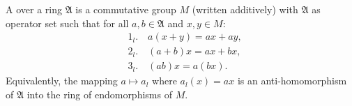 A  over a ring $\mathfrak{A}$ is a commutative group $M$ (written additively) with $\mathfrak{A}$ as operator set such that for all $a, b \in \mathfrak{A}$ and $x, y \in M$:
\begin{align*}
&1_l. \quad a(x + y) = ax + ay, \\
&2_l. \quad (a + b)x = ax + bx, \\
&3_l. \quad (ab)x = a(bx).
\end{align*}
Equivalently, the mapping $a \mapsto a_l$ where $a_l(x) = ax$ is an anti-homomorphism of $\mathfrak{A}$ into the ring of endomorphisms of $M$.
